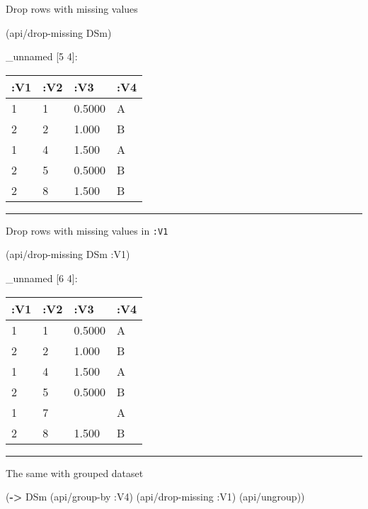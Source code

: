 \documentclass[]{article}
\newenvironment{Shaded}{\begin{snugshade}}{\end{snugshade}}
\newcommand{\KeywordTok}[1]{\textcolor[rgb]{0.13,0.29,0.53}{\textbf{#1}}}
\newcommand{\AttributeTok}[1]{\textcolor[rgb]{0.77,0.63,0.00}{#1}}
\newcommand{\NormalTok}[1]{#1}
\begin{document}
Drop rows with missing values

\begin{Shaded}
\begin{Highlighting}[]
\NormalTok{(api/drop-missing DSm)}
\end{Highlighting}
\end{Shaded}

\_unnamed {[}5 4{]}:

\begin{longtable}[]{@{}llll@{}}
\toprule
:V1 & :V2 & :V3 & :V4\tabularnewline
\midrule
\endhead
1 & 1 & 0.5000 & A\tabularnewline
2 & 2 & 1.000 & B\tabularnewline
1 & 4 & 1.500 & A\tabularnewline
2 & 5 & 0.5000 & B\tabularnewline
2 & 8 & 1.500 & B\tabularnewline
\bottomrule
\end{longtable}

\begin{center}\rule{0.5\linewidth}{0.5pt}\end{center}

Drop rows with missing values in \texttt{:V1}

\begin{Shaded}
\begin{Highlighting}[]
\NormalTok{(api/drop-missing DSm }\AttributeTok{:V1}\NormalTok{)}
\end{Highlighting}
\end{Shaded}

\_unnamed {[}6 4{]}:

\begin{longtable}[]{@{}llll@{}}
\toprule
:V1 & :V2 & :V3 & :V4\tabularnewline
\midrule
\endhead
1 & 1 & 0.5000 & A\tabularnewline
2 & 2 & 1.000 & B\tabularnewline
1 & 4 & 1.500 & A\tabularnewline
2 & 5 & 0.5000 & B\tabularnewline
1 & 7 & & A\tabularnewline
2 & 8 & 1.500 & B\tabularnewline
\bottomrule
\end{longtable}

\begin{center}\rule{0.5\linewidth}{0.5pt}\end{center}

The same with grouped dataset

\begin{Shaded}
\begin{Highlighting}[]
\NormalTok{(}\KeywordTok{->}\NormalTok{ DSm}
\NormalTok{    (api/group-by }\AttributeTok{:V4}\NormalTok{)}
\NormalTok{    (api/drop-missing }\AttributeTok{:V1}\NormalTok{)}
\NormalTok{    (api/ungroup))}
\end{Highlighting}
\end{Shaded}
\end{document}
